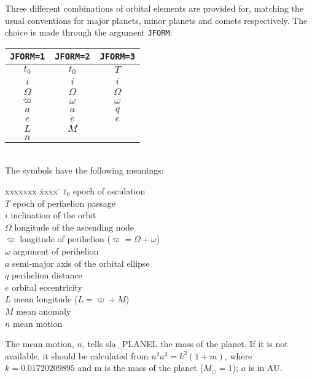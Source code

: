 \documentclass[11pt,twoside]{article}
\begin{document}
Three different combinations of orbital elements are
provided for, matching the usual conventions
for major planets, minor planets and
comets respectively.  The choice is made through the
argument {\tt JFORM}:

\vspace{1ex}
\hspace{3em}
\begin{tabular}{|c|c|c|} \hline
{\tt JFORM=1} & {\tt JFORM=2} & {\tt JFORM=3} \\
\hline \hline
$t_0$ & $t_0$ & $T$ \\
\hline
$i$ & $i$ & $i$ \\
\hline
$\Omega$ & $\Omega$ & $\Omega$ \\
\hline
$\varpi$ & $\omega$ & $\omega$ \\
\hline
$a$ & $a$ & $q$ \\
\hline
$e$ & $e$ & $e$ \\
\hline
$L$ & $M$ & \\
\hline
$n$ & & \\
\hline
\end{tabular}\\[2ex]
The symbols have the following meanings:

\vspace{-1ex}
\begin{tabbing}
xxxxxxx \= xxxx \= \kill
\> $t_0$ \> epoch of osculation \\
\> $T$ \> epoch of perihelion passage \\
\> $i$ \> inclination of the orbit \\
\> $\Omega$ \> longitude of the ascending node \\
\> $\varpi$ \> longitude of perihelion ($\varpi = \Omega + \omega$) \\
\> $\omega$ \> argument of perihelion \\
\> $a$ \> semi-major axis of the orbital ellipse \\
\> $q$ \> perihelion distance \\
\> $e$ \> orbital eccentricity \\
\> $L$ \> mean longitude ($L = \varpi + M$) \\
\> $M$ \> mean anomaly \\
\> $n$ \> mean motion \\
\end{tabbing}

The mean motion, $n$, tells sla\_PLANEL the mass of the planet.
If it is not available, it should be calculated
from $n^2 a^3 = k^2 (1+m)$, where $k = 0.01720209895$ and
m is the mass of the planet ($M_\odot = 1$); $a$ is in AU.
\end{document}
